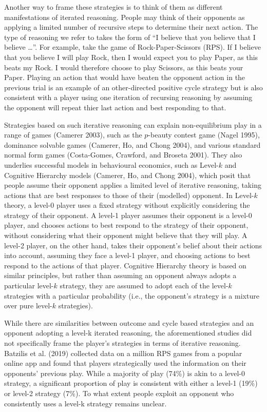 \documentclass[smallextended]{svjour3}       %
\begin{document}
Another way to frame these strategies is to think of them as different
manifestations of iterated reasoning. People may think of their
opponents as applying a limited number of recursive steps to determine
their next action. The type of reasoning we refer to takes the form of
``I believe that you believe that I believe \ldots{}''. For example,
take the game of Rock-Paper-Scissors (RPS). If I believe that you
believe I will play Rock, then I would expect you to play Paper, as this
beats my Rock. I would therefore choose to play Scissors, as this beats
your Paper. Playing an action that would have beaten the opponent action
in the previous trial is an example of an other-directed positive cycle
strategy but is also consistent with a player using one iteration of
recursing reasoning by assuming the opponent will repeat thier last
action and best responding to that.

Strategies based on such iterative reasoning can explain non-equilibrium
play in a range of games (Camerer 2003), such as the \(p\)-beauty
contest game (Nagel 1995), dominance solvable games (Camerer, Ho, and
Chong 2004), and various standard normal form games (Costa-Gomes,
Crawford, and Broseta 2001). They also underlies successful models in
behavioural economics, such as Level-\(k\) and Cognitive Hierarchy
models (Camerer, Ho, and Chong 2004), which posit that people assume
their opponent applies a limited level of iterative reasoning, taking
actions that are best responses to those of their (modelled) opponent.
In Level-\(k\) theory, a level-0 player uses a fixed strategy without
explicitly considering the strategy of their opponent. A level-1 player
assumes their opponent is a level-0 player, and chooses actions to best
respond to the strategy of their opponent, without considering what
their opponent might believe that they will play. A level-2 player, on
the other hand, takes their opponent's belief about their actions into
account, assuming they face a level-1 player, and choosing actions to
best respond to the actions of that player. Cognitive Hierarchy theory
is based on similar principles, but rather than assuming an opponent
always adopts a particular level-\(k\) strategy, they are assumed to
adopt each of the level-\(k\) strategies with a particular probability
(i.e., the opponent's strategy is a mixture over pure level-\(k\)
strategies).

While there are similarities between outcome and cycle based strategies
and an opponent adopting a level-k iterated reasoning, the
aforementioned studies did not specifically frame the player's
strategies in terms of iterative reasoning. Batzilis et al. (2019)
collected data on a million RPS games from a popular online app and
found that players strategically used the information on their
opponents' previous play. While a majority of play (74\%) is akin to a
level-0 strategy, a significant proportion of play is consistent with
either a level-1 (19\%) or level-2 strategy (7\%). To what extent people
exploit an opponent who consistently uses a level-k strategy remains
unclear.
\end{document}
